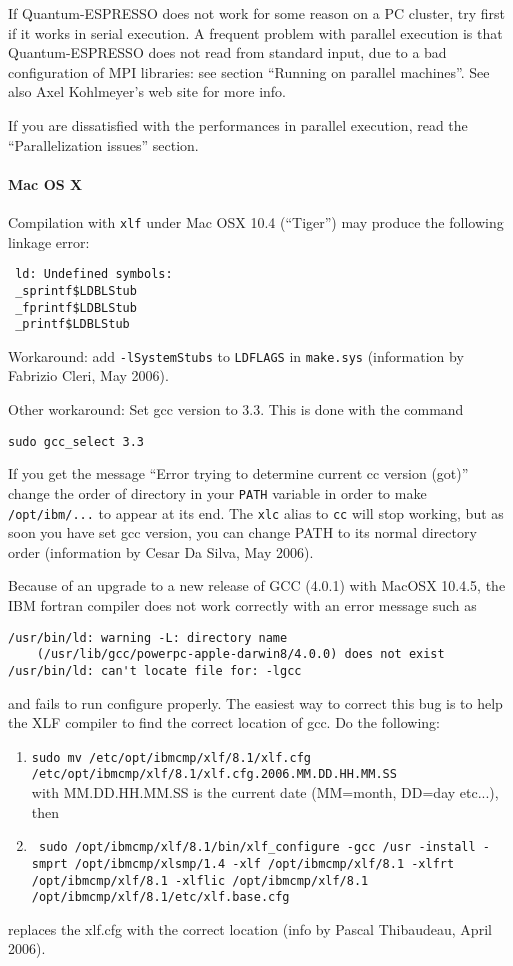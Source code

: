 \documentclass[12pt,a4paper]{article}
\begin{document}
If Quantum-ESPRESSO does not work for some reason on a PC cluster, try first 
if it works in serial execution. A frequent problem with parallel execution
is that Quantum-ESPRESSO does not read from standard input, due to a bad 
configuration of MPI libraries: see section ``Running on parallel machines''.
See also Axel Kohlmeyer's web site for more info.      

If you are dissatisfied with the performances in parallel 
execution, read the ``Parallelization issues'' section.

\paragraph{Mac OS X}

Compilation with \texttt{xlf} under Mac OSX 10.4 (``Tiger'') may produce
the following linkage error:
\begin{verbatim}
 ld: Undefined symbols:
 _sprintf$LDBLStub
 _fprintf$LDBLStub
 _printf$LDBLStub
\end{verbatim}
Workaround: add \texttt{-lSystemStubs} to \texttt{LDFLAGS} in 
\texttt{make.sys} (information by Fabrizio Cleri, May 2006). 

Other workaround: Set gcc version to 3.3. This is done with the command
\begin{verbatim}
sudo gcc_select 3.3
\end{verbatim}
If you get the message ``Error trying to determine current cc version (got)'' 
change the order of directory in your \texttt{PATH} variable in order to make
\texttt{/opt/ibm/...} to appear at its end. The \texttt{xlc} alias to 
\texttt{cc} will stop working, but as soon you have set gcc version,
you can change PATH to its normal directory order (information by Cesar 
Da Silva, May 2006).

Because of an upgrade to a new release of GCC (4.0.1) with MacOSX 10.4.5, 
the IBM fortran compiler does not work correctly with an error message
such as
\begin{verbatim}
/usr/bin/ld: warning -L: directory name 
    (/usr/lib/gcc/powerpc-apple-darwin8/4.0.0) does not exist
/usr/bin/ld: can't locate file for: -lgcc
\end{verbatim}
and fails to run configure properly. The easiest way to correct this bug 
is to help the XLF compiler to find the correct location of gcc. Do the
following:
\begin{enumerate}
\item {\tt sudo mv /etc/opt/ibmcmp/xlf/8.1/xlf.cfg \\
                   /etc/opt/ibmcmp/xlf/8.1/xlf.cfg.2006.MM.DD.HH.MM.SS} \\
with MM.DD.HH.MM.SS is the current date (MM=month, DD=day etc...), then
\item {\tt
sudo /opt/ibmcmp/xlf/8.1/bin/xlf\_configure -gcc /usr -install -smprt 
    /opt/ibmcmp/xlsmp/1.4 -xlf /opt/ibmcmp/xlf/8.1 -xlfrt 
    /opt/ibmcmp/xlf/8.1 -xlflic /opt/ibmcmp/xlf/8.1  \\
   /opt/ibmcmp/xlf/8.1/etc/xlf.base.cfg}
\end{enumerate}
replaces the xlf.cfg with the correct location (info by Pascal 
Thibaudeau, April 2006).
\end{document}

